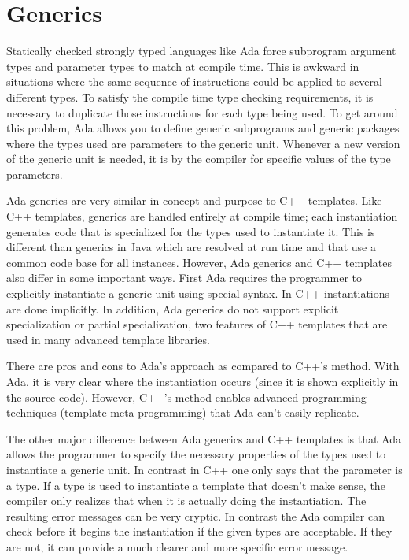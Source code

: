 \section{Generics}

Statically checked strongly typed languages like Ada force subprogram argument types and
parameter types to match at compile time. This is awkward in situations where the same sequence
of instructions could be applied to several different types. To satisfy the compile time type
checking requirements, it is necessary to duplicate those instructions for each type being used.
To get around this problem, Ada allows you to define generic subprograms and generic packages
where the types used are parameters to the generic unit. Whenever a new version of the generic
unit is needed, it is  by the compiler for specific values of the type
parameters.

Ada generics are very similar in concept and purpose to C++ templates. Like C++ templates,
generics are handled entirely at compile time; each instantiation generates code that is
specialized for the types used to instantiate it. This is different than generics in Java which
are resolved at run time and that use a common code base for all instances. However, Ada
generics and C++ templates also differ in some important ways. First Ada requires the programmer
to explicitly instantiate a generic unit using special syntax. In C++ instantiations are done
implicitly. In addition, Ada generics do not support explicit specialization or partial
specialization, two features of C++ templates that are used in many advanced template libraries.

There are pros and cons to Ada's approach as compared to C++'s method. With Ada, it is very
clear where the instantiation occurs (since it is shown explicitly in the source code). However,
C++'s method enables advanced programming techniques (template meta-programming) that Ada can't
easily replicate.

The other major difference between Ada generics and C++ templates is that Ada allows the
programmer to specify the necessary properties of the types used to instantiate a generic unit.
In contrast in C++ one only says that the parameter is a type. If a type is used to instantiate
a template that doesn't make sense, the compiler only realizes that when it is actually doing
the instantiation. The resulting error messages can be very cryptic. In contrast the Ada
compiler can check before it begins the instantiation if the given types are acceptable. If they
are not, it can provide a much clearer and more specific error message.

